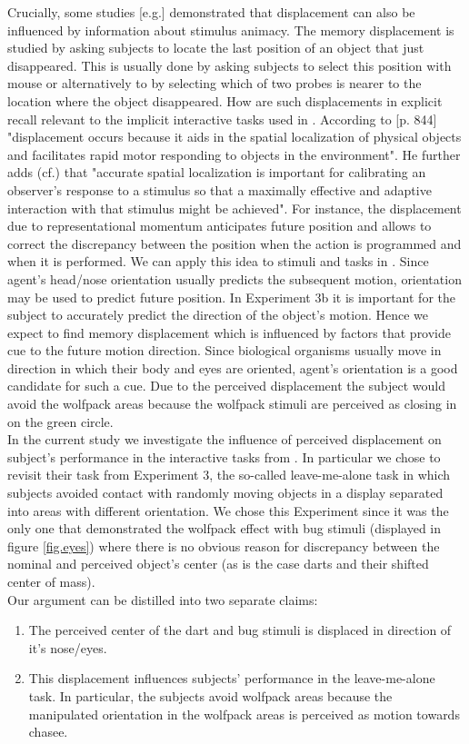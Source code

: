 \documentclass{article}
\begin{document}
Crucially, some studies \citep{freyd92}[e.g.] demonstrated that displacement can also be influenced by information about stimulus animacy. 
The memory displacement is studied by asking subjects to locate the last position of an object that just disappeared.
This is usually done by asking subjects to select this position with mouse or alternatively to by selecting which of two probes is nearer to the location where the object disappeared.
How are such displacements in explicit recall relevant to the implicit interactive tasks used in \citet{gao10}.
According to \citet{hubbard05}[p. 844] "displacement occurs because it aids in the spatial localization of physical objects and facilitates rapid motor responding to objects in the environment". 
He further adds (cf.) that "accurate spatial localization is important for calibrating an observer's response to a stimulus so that a maximally effective and adaptive interaction with that stimulus might be achieved". 
For instance, the displacement due to representational momentum anticipates future position and allows to correct the discrepancy between the position when the action is programmed and when it is performed. 
We can apply this idea to stimuli and tasks in \citet{gao10}. Since agent's head/nose orientation usually predicts the subsequent motion, orientation may be used to predict future position. 
In Experiment 3b it is important for the subject to accurately predict the direction of the object's motion. 
Hence we expect to find memory displacement which is influenced by factors that provide cue to the future motion direction. 
Since biological organisms usually move in direction in which their body and eyes are oriented, agent's orientation is a good candidate for such a cue.  
Due to the perceived displacement the subject would avoid the wolfpack areas because the wolfpack stimuli are perceived as closing in on the green circle.\\
In the current study we investigate the influence of perceived displacement on subject's performance in the interactive tasks from \citet{gao10}. 
In particular we chose to revisit their task from Experiment 3, the so-called leave-me-alone task in which subjects avoided contact with randomly moving objects in a display separated into areas with different orientation. 
We chose this Experiment since it was the only one that demonstrated the wolfpack effect with bug stimuli (displayed in figure \ref{fig.eyes}) where there is no obvious reason for discrepancy between the nominal and perceived object's center (as is the case darts and their shifted center of mass).\\
Our argument can be distilled into two separate claims:
\begin{enumerate}
  \item The perceived center of the dart and bug stimuli is displaced in direction of it's nose/eyes.
  \item This displacement influences subjects' performance in the leave-me-alone task. 
In particular, the subjects avoid wolfpack areas because the manipulated orientation in the wolfpack areas is perceived as motion towards chasee.
\end{enumerate}  
\end{document}
